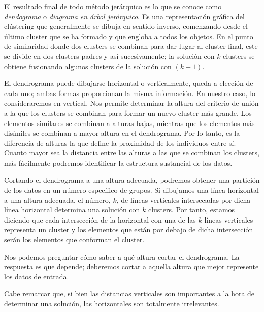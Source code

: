 El resultado final de todo método jerárquico es lo que se conoce como \textit{dendograma} o \textit{diagrama en árbol jerárquico}. Es una representación gráfica del clústering que generalmente se
dibuja en sentido inverso, comenzando desde el último cluster que se ha formado y que engloba a todos los objetos. En el punto de similaridad donde dos clusters se combinan 
para dar lugar al cluster final, este se divide en dos clusters padres y así sucesivamente; la solución con $k$ clusters se obtiene fusionando algunos clusters de la solución con $(k+1)$. \newline

El dendrograma puede dibujarse horizontal o verticalmente, queda a elección de cada uno; ambas formas proporcionan la misma información. En nuestro caso, lo consideraremos en vertical. Nos permite 
determinar la altura del criterio de unión a la que los clusters se combinan para formar un nuevo cluster más grande. Los elementos similares se combinan a alturas bajas, mientras que los elementos
más disímiles se combinan a mayor altura en el dendrograma. Por lo tanto, es la diferencia de alturas la que define la proximidad de los individuos entre sí. Cuanto mayor sea la distancia entre las
alturas a las que se combinan los clusters, más fácilmente podremos identificar la estructura sustancial de los datos. \newline

Cortando el dendrograma a una altura adecuada, podremos obtener una partición de los datos en un número específico de grupos. Si dibujamos una línea horizontal a una altura adecuada, el número, $k$, de 
líneas verticales intersecadas por dicha línea horizontal determina una solución con $k$ clusters. Por tanto, estamos diciendo que cada intersección de la horizontal con una de las $k$ líneas verticales
representa un cluster y los elementos que están por debajo de dicha intersección serán los elementos que conforman el cluster. \newline

Nos podemos preguntar cómo saber a qué altura cortar el dendrograma. La respuesta es que depende; deberemos cortar a aquella altura que mejor represente los datos de entrada.\newline %

\begin{nota}
    
    Cabe remarcar que, si bien las distancias verticales son importantes a la hora de determinar una solución, las horizontales son totalmente irrelevantes. \newline

\end{nota}

